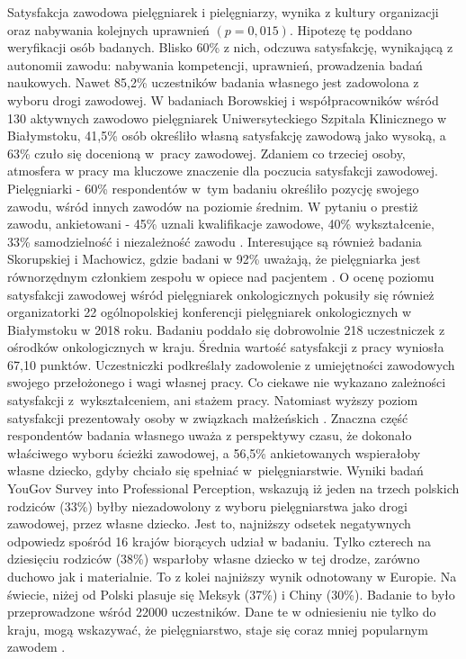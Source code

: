 \documentclass[a4paper,12pt,twoside,openright]{mwrep}
\begin{document}
Satysfakcja zawodowa pielęgniarek i pielęgniarzy, wynika z kultury organizacji oraz nabywania kolejnych uprawnień $(p=0,015)$. Hipotezę tę poddano weryfikacji osób badanych.  Blisko 60\%  z nich,  odczuwa satysfakcję, wynikającą z autonomii zawodu: nabywania kompetencji, uprawnień, prowadzenia badań naukowych.  Nawet  85,2\%   uczestników badania własnego jest zadowolona z wyboru drogi zawodowej. W badaniach Borowskiej i współpracowników  wśród 130 aktywnych zawodowo pielęgniarek  Uniwersyteckiego Szpitala Klinicznego w Białymstoku, 41,5\% osób określiło własną satysfakcję zawodową jako wysoką, a 63\% czuło się docenioną w~pracy zawodowej. Zdaniem co trzeciej osoby, atmosfera w pracy ma kluczowe znaczenie dla poczucia satysfakcji zawodowej. Pielęgniarki - 60\% respondentów w~tym badaniu określiło  pozycję swojego zawodu, wśród innych zawodów na poziomie średnim. W pytaniu o prestiż zawodu, ankietowani - 45\% uznali kwalifikacje zawodowe, 40\% wykształcenie, 33\% samodzielność i niezależność zawodu \cite{zbiorowa}. Interesujące są również badania Skorupskiej  i Machowicz, gdzie badani w 92\% uważają, że pielęgniarka jest równorzędnym członkiem zespołu w opiece nad pacjentem \cite{skorupska}. O ocenę poziomu satysfakcji zawodowej wśród pielęgniarek onkologicznych pokusiły się również  organizatorki 22 ogólnopolskiej konferencji pielęgniarek onkologicznych w Białymstoku w 2018 roku. Badaniu poddało się dobrowolnie 218 uczestniczek z ośrodków onkologicznych w kraju. Średnia wartość satysfakcji z pracy wyniosła 67,10 punktów. Uczestniczki podkreślały zadowolenie z umiejętności zawodowych swojego przełożonego i wagi własnej pracy. Co ciekawe nie wykazano zależności satysfakcji z~wykształceniem, ani stażem pracy. Natomiast wyższy poziom satysfakcji prezentowały osoby w związkach małżeńskich \cite{onkologiczne}. Znaczna część respondentów  badania własnego uważa z perspektywy czasu, że dokonało właściwego wyboru ścieżki zawodowej, a 56,5\%  ankietowanych wspierałoby własne dziecko, gdyby chciało się spełniać w~pielęgniarstwie. Wyniki badań   YouGov Survey into Professional Perception,  wskazują iż  jeden na trzech polskich rodziców (33\%) byłby niezadowolony z wyboru pielęgniarstwa jako drogi zawodowej, przez własne dziecko.  Jest to, najniższy odsetek negatywnych odpowiedz spośród 16 krajów biorących udział w badaniu. Tylko czterech na dziesięciu rodziców (38\%) wsparłoby własne dziecko w tej drodze, zarówno duchowo jak i materialnie. To  z kolei najniższy wynik odnotowany w Europie. Na świecie, niżej od Polski plasuje się  Meksyk (37\%) i Chiny (30\%). Badanie to było przeprowadzone wśród  22000 uczestników. Dane te  w odniesieniu nie tylko do kraju, mogą wskazywać, że pielęgniarstwo, staje się coraz mniej popularnym zawodem \cite{yougov}.
\end{document}

